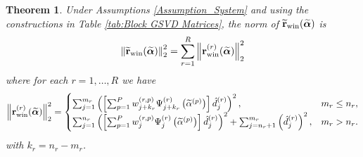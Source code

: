 \documentclass[12pt]{article}
\newtheorem{theorem}{Theorem}[section]
\begin{document}
\begin{theorem}
\label{thm:Regularized residual}
Under Assumptions \ref{Assumption_System} and using the constructions in Table \ref{tab:Block GSVD Matrices}, the norm of $\widetilde{\mathbf{r}}_{\text{win}}(\widetilde{\bm{\alpha}})$ is
\[\left\|\widetilde{\mathbf{r}}_{\text{win}}(\widetilde{\bm{\alpha}})\right\|_2^2 = \sum_{r=1}^{R}\left\|\mathbf{r}_{\text{win}}^{(r)}(\widetilde{\bm{\alpha}})\right\|_2^2\]
where for each $r = 1,\ldots,R$ we have
\[\left\|\mathbf{r}_{\text{win}}^{(r)}(\widetilde{\bm{\alpha}})\right\|_2^2 = \begin{cases}
\sum_{j=1}^{m_r} \left(\left[\sum_{p=1}^{P} w_{j+k_r}^{(r,p)}\Psi_{j+k_r}^{(r)}\left(\widetilde{\alpha}^{(p)}\right)\right] \hat{d}_j^{(r)}\right)^2, & m_r \leq n_r, \\
\sum_{j=1}^{n_r} \left(\left[\sum_{p=1}^{P} w_{j}^{(r,p)}\Psi_{j}^{(r)}\left(\widetilde{\alpha}^{(p)}\right)\right] \hat{d}_j^{(r)}\right)^2 + \sum_{j = n_r + 1}^{m_r} \left(\hat{d}_j^{(r)}\right)^2, & m_r > n_r.
\end{cases}\]
with $k_r = n_r - m_r$.
\end{theorem}
\end{document}
